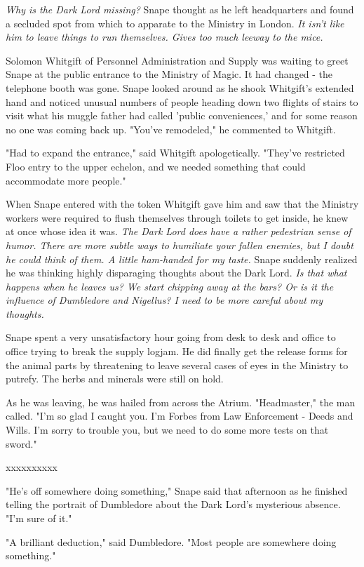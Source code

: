 \documentclass[a4paper,11pt]{article}
\begin{document}
\emph{Why is the Dark Lord missing?} Snape thought as he left headquarters and found a secluded spot from which to apparate to the Ministry in London. \emph{It isn't like him to leave things to run themselves. Gives too much leeway to the mice.}

Solomon Whitgift of Personnel Administration and Supply was waiting to greet Snape at the public entrance to the Ministry of Magic. It had changed - the telephone booth was gone. Snape looked around as he shook Whitgift's extended hand and noticed unusual numbers of people heading down two flights of stairs to visit what his muggle father had called 'public conveniences,' and for some reason no one was coming back up. "You've remodeled," he commented to Whitgift.

"Had to expand the entrance," said Whitgift apologetically. "They've restricted Floo entry to the upper echelon, and we needed something that could accommodate more people."

When Snape entered with the token Whitgift gave him and saw that the Ministry workers were required to flush themselves through toilets to get inside, he knew at once whose idea it was. \emph{The Dark Lord does have a rather pedestrian sense of humor. There are more subtle ways to humiliate your fallen enemies, but I doubt he could think of them. A little ham-handed for my taste.} Snape suddenly realized he was thinking highly disparaging thoughts about the Dark Lord. \emph{Is that what happens when he leaves us? We start chipping away at the bars? Or is it the influence of Dumbledore and Nigellus? I need to be more careful about my thoughts.}

Snape spent a very unsatisfactory hour going from desk to desk and office to office trying to break the supply logjam. He did finally get the release forms for the animal parts by threatening to leave several cases of eyes in the Ministry to putrefy. The herbs and minerals were still on hold.

As he was leaving, he was hailed from across the Atrium. "Headmaster," the man called. "I'm so glad I caught you. I'm Forbes from Law Enforcement - Deeds and Wills. I'm sorry to trouble you, but we need to do some more tests on that sword."

xxxxxxxxxx

"He's off somewhere doing something," Snape said that afternoon as he finished telling the portrait of Dumbledore about the Dark Lord's mysterious absence. "I'm sure of it."

"A brilliant deduction," said Dumbledore. "Most people are somewhere doing something."
\end{document}
